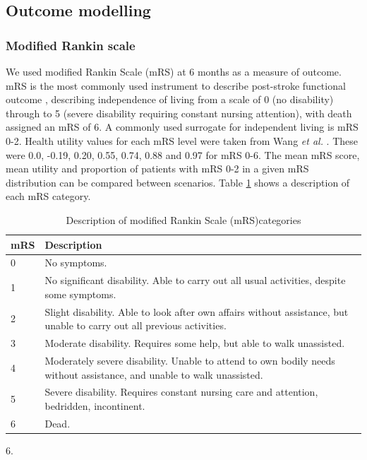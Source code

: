 \subsection{Outcome modelling}

\subsubsection{Modified Rankin scale}

We used modified Rankin Scale (mRS) at 6 months as a measure of outcome. mRS is the most commonly used instrument to describe post-stroke functional outcome \cite{quinn_functional_2009}, describing independence of living from a scale of 0 (no disability) through to 5 (severe disability requiring constant nursing attention), with death assigned an mRS of 6. A commonly used surrogate for independent living is  mRS 0-2. Health utility values for each mRS level were taken from Wang \textit{et al.} \cite{wang_utility-weighted_2020}. These were 0.0, -0.19, 0.20, 0.55, 0.74, 0.88 and 0.97 for mRS 0-6. The mean mRS score, mean utility and proportion of patients with mRS 0-2 in a given mRS distribution can be compared between scenarios. Table \ref{tab:mrs} shows a description of each mRS category.

\begin{minipage}{1.0\textwidth}  %
\begin{longtable}{p{1.2cm} p{13cm}}
\caption{Description of modified Rankin Scale (mRS)categories}\label{tab:mrs}\\
\toprule
mRS & Description \\
\midrule
0 & No symptoms. \\
1 & No significant disability. Able to carry out all usual activities,
despite some symptoms. \\
2 & Slight disability. Able to look after own affairs without
assistance, but unable to carry out all previous activities. \\
3 & Moderate disability. Requires some help, but able to walk
unassisted. \\
4 & Moderately severe disability. Unable to attend to own bodily needs
without assistance, and unable to walk unassisted. \\
5 & Severe disability. Requires constant nursing care and attention,
bedridden, incontinent. \\
6 & Dead. \\
\bottomrule
\end{longtable}
\end{minipage} 
6.

